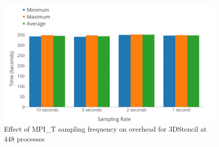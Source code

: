 \begin{center}
        \begin{figure}[tbp!]
                 \includegraphics[width=\columnwidth,keepaspectratio,scale=1.0]{figures/MPI_T_Sampling_Frequently}
                \captionsetup{justification=centering}
                  \caption{Effect of MPI\_T sampling frequency on overhead for 3DStencil at 448 processes}
                   \label{fig:sampling_frequency}
        \end{figure}
\end{center}
